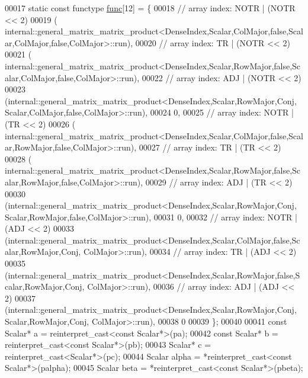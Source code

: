 \begin{DoxyCode}
00017   \textcolor{keyword}{static} \textcolor{keyword}{const} functype \hyperlink{structfunc}{func}[12] = \{
00018     \textcolor{comment}{// array index: NOTR  | (NOTR << 2)}
00019     (
      internal::general\_matrix\_matrix\_product<DenseIndex,Scalar,ColMajor,false,Scalar,ColMajor,false,ColMajor>::run),
00020     \textcolor{comment}{// array index: TR    | (NOTR << 2)}
00021     (
      internal::general\_matrix\_matrix\_product<DenseIndex,Scalar,RowMajor,false,Scalar,ColMajor,false,ColMajor>::run),
00022     \textcolor{comment}{// array index: ADJ   | (NOTR << 2)}
00023     (internal::general\_matrix\_matrix\_product<DenseIndex,Scalar,RowMajor,Conj,
       Scalar,ColMajor,false,ColMajor>::run),
00024     0,
00025     \textcolor{comment}{// array index: NOTR  | (TR   << 2)}
00026     (
      internal::general\_matrix\_matrix\_product<DenseIndex,Scalar,ColMajor,false,Scalar,RowMajor,false,ColMajor>::run),
00027     \textcolor{comment}{// array index: TR    | (TR   << 2)}
00028     (
      internal::general\_matrix\_matrix\_product<DenseIndex,Scalar,RowMajor,false,Scalar,RowMajor,false,ColMajor>::run),
00029     \textcolor{comment}{// array index: ADJ   | (TR   << 2)}
00030     (internal::general\_matrix\_matrix\_product<DenseIndex,Scalar,RowMajor,Conj,
       Scalar,RowMajor,false,ColMajor>::run),
00031     0,
00032     \textcolor{comment}{// array index: NOTR  | (ADJ  << 2)}
00033     (internal::general\_matrix\_matrix\_product<DenseIndex,Scalar,ColMajor,false,Scalar,RowMajor,Conj,
       ColMajor>::run),
00034     \textcolor{comment}{// array index: TR    | (ADJ  << 2)}
00035     (internal::general\_matrix\_matrix\_product<DenseIndex,Scalar,RowMajor,false,Scalar,RowMajor,Conj,
       ColMajor>::run),
00036     \textcolor{comment}{// array index: ADJ   | (ADJ  << 2)}
00037     (internal::general\_matrix\_matrix\_product<DenseIndex,Scalar,RowMajor,Conj, Scalar,RowMajor,Conj,
       ColMajor>::run),
00038     0
00039   \};
00040 
00041   \textcolor{keyword}{const} Scalar* a = \textcolor{keyword}{reinterpret\_cast<}\textcolor{keyword}{const }Scalar*\textcolor{keyword}{>}(pa);
00042   \textcolor{keyword}{const} Scalar* b = \textcolor{keyword}{reinterpret\_cast<}\textcolor{keyword}{const }Scalar*\textcolor{keyword}{>}(pb);
00043   Scalar* c = \textcolor{keyword}{reinterpret\_cast<}Scalar*\textcolor{keyword}{>}(pc);
00044   Scalar alpha  = *\textcolor{keyword}{reinterpret\_cast<}\textcolor{keyword}{const }Scalar*\textcolor{keyword}{>}(palpha);
00045   Scalar beta   = *\textcolor{keyword}{reinterpret\_cast<}\textcolor{keyword}{const }Scalar*\textcolor{keyword}{>}(pbeta);

\end{DoxyCode}
